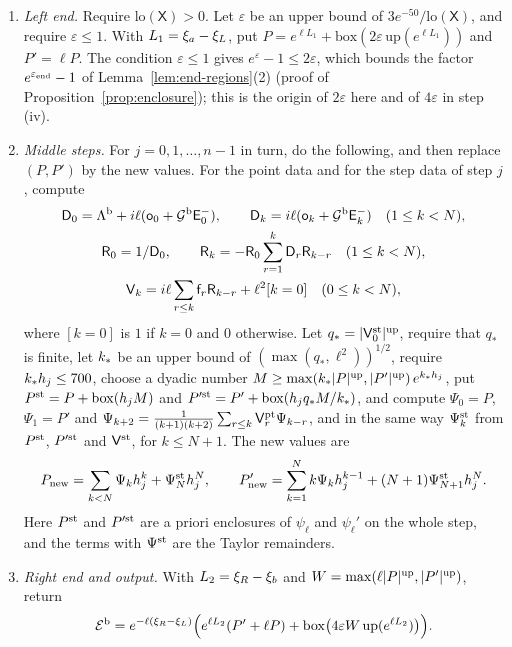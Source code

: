 \begin{enumerate}[label=\textup{(\roman*)}]
  coefficients at every point of the step, for the a priori enclosures on the step
  and the remainders.
\item \emph{Left end.} Require $\mathrm{lo}(\mathsf X)>0$. Let $\varepsilon$ be an upper
  bound of $3e^{-50}/\mathrm{lo}(\mathsf X)$, and require $\varepsilon\le1$. With
  $L_1=\xi_a-\xi_L$, put
  $P=e^{\ell L_1}+\mathrm{box}(2\varepsilon\,\mathrm{up}(e^{\ell L_1}))$ and $P'=\ell P$.
  The condition $\varepsilon\le1$ gives $e^{\varepsilon}-1\le2\varepsilon$, which
  bounds the factor $e^{\varepsilon_{\mathrm{end}}}-1$ of Lemma~\ref{lem:end-regions}(2) (proof of
  Proposition~\ref{prop:enclosure}); this is the origin of $2\varepsilon$ here and
  of $4\varepsilon$ in step (iv).
\item \emph{Middle steps.} For $j=0,1,\dots,n-1$ in turn, do the following, and then
  replace $(P,P')$ by the new values. For the point data and for the step data of
  step $j$, compute
  \[
  \begin{gathered}
  \mathsf D_0=\Lambda^{\rm b}+i\ell(\mathsf o_0+\mathcal G^{\rm b}\mathsf E^-_0),\qquad
  \mathsf D_k=i\ell(\mathsf o_k+\mathcal G^{\rm b}\mathsf E^-_k)\quad(1\le k<N),\\
  \mathsf R_0=1/\mathsf D_0,\qquad \mathsf R_k=-\mathsf R_0\sum_{r=1}^k\mathsf D_r\mathsf R_{k-r}\quad(1\le k<N),\\
  \mathsf V_k=i\ell\sum_{r\le k}\mathsf f_r\mathsf R_{k-r}+\ell^2[k=0]\quad(0\le k<N),
  \end{gathered}
  \]
  where $[k=0]$ is $1$ if $k=0$ and $0$ otherwise. Let $q_*=|\mathsf V^{\rm st}_0|^{\rm up}$,
  require that $q_*$ is finite, let $k_*$ be an upper bound of
  $(\max(q_*,\ell^2))^{1/2}$, require $k_* h_j\le700$, choose a dyadic number
  $M\ge\max(k_*|P|^{\rm up},|P'|^{\rm up})\,e^{k_* h_j}$, put
  $P^{\rm st}=P+\mathrm{box}(h_jM)$ and $P'^{\rm st}=P'+\mathrm{box}(h_jq_*M/k_*)$,
  and compute $\Psi_0=P$, $\Psi_1=P'$ and
  $\Psi_{k+2}=\frac1{(k+1)(k+2)}\sum_{r\le k}\mathsf V^{\rm pt}_r\Psi_{k-r}$, and in the same
  way $\Psi^{\rm st}_k$ from $P^{\rm st}$, $P'^{\rm st}$ and $\mathsf V^{\rm st}$, for
  $k\le N+1$. The new values are
  \[
  P_{\rm new}=\sum_{k<N}\Psi_kh_j^k+\Psi^{\rm st}_Nh_j^N,\qquad
  P'_{\rm new}=\sum_{k=1}^Nk\Psi_kh_j^{k-1}+(N+1)\Psi^{\rm st}_{N+1}h_j^N .
  \]
  Here $P^{\rm st}$ and $P'^{\rm st}$ are a priori enclosures of $\psi_\ell$ and
  $\psi_\ell'$ on the whole step, and the terms with $\Psi^{\rm st}$ are the Taylor
  remainders.
\item \emph{Right end and output.} With $L_2=\xi_R-\xi_b$ and
  $W=\max(\ell|P|^{\rm up},|P'|^{\rm up})$, return
  \[
  \mathcal{E}^{\rm b}=e^{-\ell(\xi_R-\xi_L)}\Big(e^{\ell L_2}(P'+\ell P)
  +\mathrm{box}\big(4\varepsilon W\,\mathrm{up}(e^{\ell L_2})\big)\Big).
  \]
\end{enumerate}

